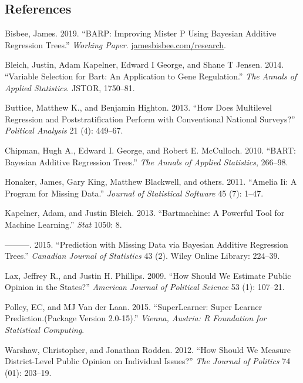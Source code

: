 \documentclass[]{article}
\begin{document}
\subsection*{References}\label{references}

\hypertarget{refs}{}
\hypertarget{ref-bisbee2019barp}{}
Bisbee, James. 2019. ``BARP: Improving Mister P Using Bayesian Additive
Regression Trees.'' \emph{Working Paper}.
\url{jamesbisbee.com/research}.

\hypertarget{ref-bleich2014variable}{}
Bleich, Justin, Adam Kapelner, Edward I George, and Shane T Jensen.
2014. ``Variable Selection for Bart: An Application to Gene
Regulation.'' \emph{The Annals of Applied Statistics}. JSTOR, 1750--81.

\hypertarget{ref-buttice_how_2013}{}
Buttice, Matthew K., and Benjamin Highton. 2013. ``How Does Multilevel
Regression and Poststratification Perform with Conventional National
Surveys?'' \emph{Political Analysis} 21 (4): 449--67.

\hypertarget{ref-chipman_bart:_2010}{}
Chipman, Hugh A., Edward I. George, and Robert E. McCulloch. 2010.
``BART: Bayesian Additive Regression Trees.'' \emph{The Annals of
Applied Statistics}, 266--98.

\hypertarget{ref-honaker2011amelia}{}
Honaker, James, Gary King, Matthew Blackwell, and others. 2011. ``Amelia
Ii: A Program for Missing Data.'' \emph{Journal of Statistical Software}
45 (7): 1--47.

\hypertarget{ref-kapelner2013bartmachine}{}
Kapelner, Adam, and Justin Bleich. 2013. ``Bartmachine: A Powerful Tool
for Machine Learning.'' \emph{Stat} 1050: 8.

\hypertarget{ref-kapelner2015prediction}{}
---------. 2015. ``Prediction with Missing Data via Bayesian Additive
Regression Trees.'' \emph{Canadian Journal of Statistics} 43 (2). Wiley
Online Library: 224--39.

\hypertarget{ref-lax_how_2009}{}
Lax, Jeffrey R., and Justin H. Phillips. 2009. ``How Should We Estimate
Public Opinion in the States?'' \emph{American Journal of Political
Science} 53 (1): 107--21.

\hypertarget{ref-polley2015superlearner}{}
Polley, EC, and MJ Van der Laan. 2015. ``SuperLearner: Super Learner
Prediction.(Package Version 2.0-15).'' \emph{Vienna, Austria: R
Foundation for Statistical Computing}.

\hypertarget{ref-warshaw_how_2012}{}
Warshaw, Christopher, and Jonathan Rodden. 2012. ``How Should We Measure
District-Level Public Opinion on Individual Issues?'' \emph{The Journal
of Politics} 74 (01): 203--19.
\end{document}
